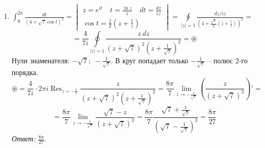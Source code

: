 \documentclass[14pt, a4paper, titlepage, fleqn]{extarticle}
\DeclareMathOperator*{\res}{Res}
\begin{document}
\begin{enumerate}
            \item \(
                 \int_{0}^{2\pi} \frac{dt}{(4+\sqrt{7} \cos t)^2 } = \begin{vmatrix}
                    z = e^{it} \quad t = \frac{\ln z}{i} \quad dt = \frac{dz}{iz} \\
                    \cos t = \frac{1}{2} \left( z + \frac{1}{z} \right)
                \end{vmatrix} = \oint\limits_{|z|=1} \frac{dz/iz}{\left( 4 + \frac{\sqrt{7}}{2} \left( z + \frac{1}{z} \right) \right)^2} =
            \)
            \[
                = \frac{4}{7i} \oint\limits_{|z|=1} \frac{z ~ dz}{ (z+\sqrt{7})^2 \left( z + \frac{1}{\sqrt{7}} \right)^2} = \circledast
            \]
            Нули знаменателя: \( -\sqrt{7}; ~ -\frac{1}{\sqrt{7}} \). В круг попадает только \( -\frac{1}{\sqrt{7}} \) -- полюс 2-го порядка.
            \[
                \circledast = \frac{4}{7i} \cdot 2\pi i \res_{z = -\frac{1}{7}} \frac{z}{ (z+\sqrt{7})^2 \left( z + \frac{1}{\sqrt{7}} \right)^2} = \frac{8\pi}{7} \lim_{z\to -\frac{1}{\sqrt{7}}} \left( \frac{z}{(z+\sqrt{7})^2} \right)' =
            \]
            \[
                = \frac{8\pi}{7} \lim_{z\to -\frac{1}{\sqrt{7}}} \frac{\sqrt{7} - z}{\left( z+\sqrt{7} \right)^3} = \frac{8\pi}{7} \frac{\sqrt{7} + \frac{1}{\sqrt{7}}}{(\sqrt{7} - \frac{1}{\sqrt{7}})^3} = \frac{8\pi}{27}
            \]
            \textit{Ответ:} \( \frac{8\pi}{27} \).


\end{enumerate}
\end{document}
